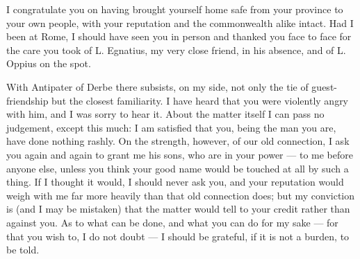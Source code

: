 

 I congratulate you on having brought yourself home safe from your province to your own people, with your reputation and the commonwealth alike intact. Had I been at Rome, I should have seen you in person and thanked you face to face for the care you took of L. Egnatius, my very close friend, in his absence, and of L. Oppius on the spot.

 With Antipater of Derbe there subsists, on my side, not only the tie of guest-friendship but the closest familiarity. I have heard that you were violently angry with him, and I was sorry to hear it. About the matter itself I can pass no judgement, except this much: I am satisfied that you, being the man you are, have done nothing rashly. On the strength, however, of our old connection, I ask you again and again to grant me his sons, who are in your power --- to me before anyone else, unless you think your good name would be touched at all by such a thing. If I thought it would, I should never ask you, and your reputation would weigh with me far more heavily than that old connection does; but my conviction is (and I may be mistaken) that the matter would tell to your credit rather than against you. As to what can be done, and what you can do for my sake --- for that you wish to, I do not doubt --- I should be grateful, if it is not a burden, to be told.
